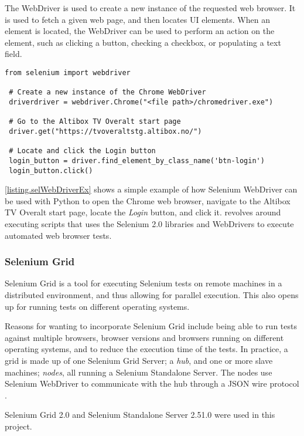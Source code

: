 The WebDriver is used to create a new instance of the requested web browser. It is used to fetch a given web page, and then locates UI elements. When an element is located, the WebDriver can be used to perform an action on the element, such as clicking a button, checking a checkbox, or populating a text field.

\vspace{4mm}
\begin{lstlisting}[caption=Selenium WebDriver Example, label={listing.selWebDriverEx}]
 from selenium import webdriver
    
 # Create a new instance of the Chrome WebDriver
 driverdriver = webdriver.Chrome("<file path>/chromedriver.exe")
  
 # Go to the Altibox TV Overalt start page
 driver.get("https://tvoveraltstg.altibox.no/")
  
 # Locate and click the Login button
 login_button = driver.find_element_by_class_name('btn-login')
 login_button.click()
\end{lstlisting}
\noindent
\lstlistingname \space \ref{listing.selWebDriverEx} shows a simple example of how Selenium WebDriver can be used with Python to open the Chrome web browser, navigate to the Altibox TV Overalt start page, locate the \emph{Login} button, and click it. \toolname \space revolves around executing scripts that uses the Selenium 2.0 libraries and WebDrivers to execute automated web browser tests.

\subsubsection{Selenium Grid}\label{subsubsec.seleniumGrid}
Selenium Grid is a tool for executing Selenium tests on remote machines in a distributed environment, and thus allowing for parallel execution. This also opens up for running tests on different operating systems.

Reasons for wanting to incorporate Selenium Grid include being able to run tests against multiple browsers, browser versions and browsers running on different operating systems, and to reduce the execution time of the tests. In practice, a grid is made up of one Selenium Grid Server; a \emph{hub}, and one or more slave machines; \emph{nodes}, all running a Selenium Standalone Server. The nodes use Selenium WebDriver to communicate with the hub through a JSON wire protocol \cite{selGrid}.

Selenium Grid 2.0 and Selenium Standalone Server 2.51.0 were used in this project.

